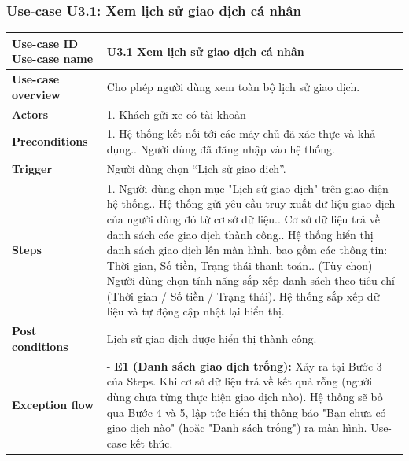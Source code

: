 \subsubsection{Use-case U3.1: Xem lịch sử giao dịch cá nhân}
\vspace{0.5cm}
\noindent
\begin{tabularx}{\textwidth}{|>{\raggedright\arraybackslash}p{4cm}|X|}
\hline
\textbf{Use-case ID} \newline \textbf{Use-case name} & U3.1 \newline \textbf{Xem lịch sử giao dịch cá nhân
} \\ \hline
\textbf{Use-case overview} & Cho phép người dùng xem toàn bộ lịch sử giao dịch. \\ \hline
\textbf{Actors} & 1. Khách gửi xe có tài khoản \\  \hline
\textbf{Preconditions} & 
1. Hệ thống kết nối tới các máy chủ đã xác thực và khả dụng.\newline
2. Người dùng đã đăng nhập vào hệ thống.\\ \hline
\textbf{Trigger} & Người dùng chọn “Lịch sử giao dịch”. \\ \hline
\textbf{Steps} & 
1. Người dùng chọn mục "Lịch sử giao dịch" trên giao diện hệ thống.\newline
2. Hệ thống gửi yêu cầu truy xuất dữ liệu giao dịch của người dùng đó từ cơ sở dữ liệu.\newline
3. Cơ sở dữ liệu trả về danh sách các giao dịch thành công.\newline
4. Hệ thống hiển thị danh sách giao dịch lên màn hình, bao gồm các thông tin: Thời gian, Số tiền, Trạng thái thanh toán.\newline
5. (Tùy chọn) Người dùng chọn tính năng sắp xếp danh sách theo tiêu chí (Thời gian / Số tiền / Trạng thái). Hệ thống sắp xếp dữ liệu và tự động cập nhật lại hiển thị.
\\ \hline

\textbf{Post conditions} & Lịch sử giao dịch được hiển thị thành công. 
 \\ \hline
\textbf{Exception flow} & 
- \textbf{E1 (Danh sách giao dịch trống):} Xảy ra tại Bước 3 của Steps. Khi cơ sở dữ liệu trả về kết quả rỗng (người dùng chưa từng thực hiện giao dịch nào). Hệ thống sẽ bỏ qua Bước 4 và 5, lập tức hiển thị thông báo "Bạn chưa có giao dịch nào" (hoặc "Danh sách trống") ra màn hình. Use-case kết thúc.\\ \hline
\end{tabularx}

